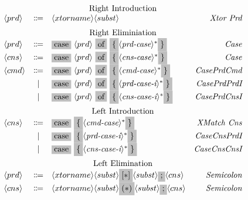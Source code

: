 \documentclass[11pt]{article}
\newcommand{\nonterminal}[1]{\langle #1 \rangle}
\newcommand{\terminal}[1]{\colorbox{lightgray}{#1}}
\begin{document}
\[
  \begin{array}{lclr}
    \multicolumn{4}{c}{\text{Right Introduction}} \\
    \nonterminal{prd} & \Coloneqq & \nonterminal{xtorname}\nonterminal{subst} & \emph{Xtor Prd} \\[0.2cm]
    \multicolumn{4}{c}{\text{Right Eliminiation}} \\
    \nonterminal{prd} & \Coloneqq & \terminal{case}\ \nonterminal{prd}\ \terminal{of}\ \terminal{\{} \nonterminal{\textit{prd-case}}^{\ast} \terminal{\}} & \emph{Case} \\
    \nonterminal{cns} & \Coloneqq & \terminal{case}\ \nonterminal{prd}\ \terminal{of}\ \terminal{\{} \nonterminal{\textit{cns-case}}^{\ast} \terminal{\}} & \emph{Case} \\
    \nonterminal{cmd} & \Coloneqq & \terminal{case}\ \nonterminal{prd}\ \terminal{of}\ \terminal{\{} \nonterminal{\textit{cmd-case}}^{\ast} \terminal{\}} & \emph{CasePrdCmd} \\
    & | & \terminal{case}\ \nonterminal{prd}\ \terminal{of}\ \terminal{\{} \nonterminal{\textit{prd-case-i}}^{\ast} \terminal{\}} & \emph{CasePrdPrdI} \\
    & | & \terminal{case}\ \nonterminal{prd}\ \terminal{of}\ \terminal{\{} \nonterminal{\textit{cns-case-i}}^{\ast} \terminal{\}} & \emph{CasePrdCnsI} \\[0.2cm]
    \multicolumn{4}{c}{\text{Left Introduction}} \\
    \nonterminal{cns} & \Coloneqq & \terminal{case}\ \terminal{\{} \nonterminal{\textit{cmd-case}}^{\ast} \terminal{\}} & \emph{XMatch Cns} \\
    & | & \terminal{case}\ \terminal{\{} \nonterminal{\textit{prd-case-i}}^{\ast} \terminal{\}} & \emph{CaseCnsPrdI} \\
    & | & \terminal{case}\ \terminal{\{} \nonterminal{\textit{cns-case-i}}^{\ast} \terminal{\}} & \emph{CaseCnsCnsI} \\[0.2cm]
    \multicolumn{4}{c}{\text{Left Elimination}} \\
    \nonterminal{prd} & \Coloneqq & \nonterminal{xtorname}\nonterminal{subst}\terminal{$[\ast]$}\nonterminal{subst}\terminal{;}\nonterminal{cns} & \emph{Semicolon} \\
    \nonterminal{cns} & \Coloneqq & \nonterminal{xtorname}\nonterminal{subst}\terminal{$(\ast)$}\nonterminal{subst}\terminal{;}\nonterminal{cns} & \emph{Semicolon} \\
  \end{array}
\]
\end{document}
